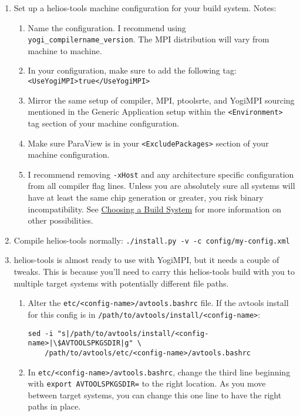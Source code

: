 \documentclass{article}
\begin{document}
\begin{enumerate}
\item Set up a helios-tools machine configuration for your build system.  Notes:
\begin{enumerate}
\item Name the configuration. I recommend using \texttt{yogi\_compilername\_version}.  The MPI distribution will vary from machine to machine.
\item In your configuration, make sure to add the following tag: \texttt{<UseYogiMPI>true</UseYogiMPI>}
\item Mirror the same setup of compiler, MPI, ptoolsrte, and YogiMPI sourcing mentioned in the Generic Application setup within the \texttt{<Environment>} tag section of your machine configuration.
\item Make sure ParaView is in your \texttt{<ExcludePackages>} section of your machine configuration.
\item I recommend removing \texttt{-xHost} and any architecture specific configuration from all compiler flag lines. Unless you are absolutely sure all systems will have at least the same chip generation or greater, you risk binary incompatibility. See \hyperref[choosebuild]{Choosing a Build System} for more information on other possibilities.
\end{enumerate}
\item Compile helios-tools normally: \texttt{./install.py -v -c config/my-config.xml}
\item helios-tools is almost ready to use with YogiMPI, but it needs a couple of tweaks.  This is because you'll need to carry this helios-tools build with you to multiple target systems with potentially different file paths.
\begin{enumerate}

\item Alter the \texttt{etc/<config-name>/avtools.bashrc} file.  If the avtools install for this config is in \texttt{/path/to/avtools/install/<config-name>}:
\begin{verbatim}
sed -i "s|/path/to/avtools/install/<config-name>|\$AVTOOLSPKGSDIR|g" \
    /path/to/avtools/etc/<config-name>/avtools.bashrc
\end{verbatim}

\item In \texttt{etc/<config-name>/avtools.bashrc}, change the third line beginning with \texttt{export AVTOOLSPKGSDIR=} to the right location.  As you move between target systems, you can change this one line to have the right paths in place.


\end{enumerate}
\end{enumerate}
\end{document}
